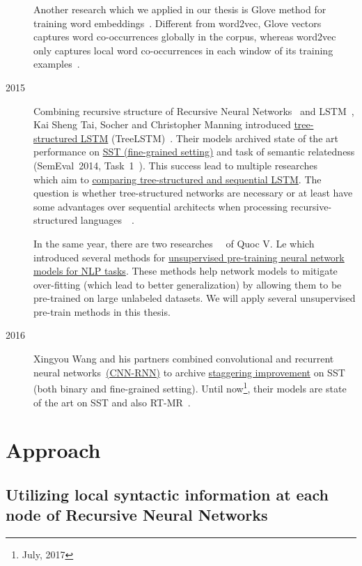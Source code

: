 \begin{description}
Another research which we applied in our thesis is Glove method for training word embeddings~\cite{glove}.
Different from word2vec, Glove vectors captures word co-occurrences globally in the corpus, whereas word2vec only captures local word co-occurrences in each window of its training examples~\cite{glove}.

\item [2015] Combining recursive structure of Recursive Neural Networks~\cite{socher2013recursive} and LSTM~\cite{originLSTM}, Kai Sheng Tai, Socher and Christopher Manning introduced \hyperref[sec:treelstm]{tree-structured LSTM}  (TreeLSTM)~\cite{treeLSTM}.
Their models archived state of the art performance on \hyperref[sec:sst]{SST (fine-grained setting)} and task of semantic relatedness (SemEval~2014, Task~1~\cite{SemeEvalTask1}).
This success lead to multiple researches~\cite{need-tree}~\cite{bowman-treevslstm}~\cite{Graves_Nature2016} which aim to \hyperref[treelstm-advantage]{comparing tree-structured and sequential LSTM}. 
The question is whether tree-structured networks are necessary or at least have some advantages over sequential architects when processing recursive-structured languages~\cite{need-tree}~\cite{bowman-treevslstm}.   

In the same year, there are two researches~\cite{ParagraphVec}~\cite{semisup-seq2seq} of Quoc V. Le which introduced several methods for \hyperref[sec:unsupervised-pretrain]{unsupervised pre-training neural network models for NLP tasks}.
These methods help network models to mitigate over-fitting (which lead to better generalization) by allowing them to be pre-trained on large unlabeled datasets.
We will apply several unsupervised pre-train methods in this thesis.

\item [2016] Xingyou Wang and his partners combined convolutional and recurrent neural networks~\hyperref[cnn-rnn]{(CNN-RNN)} to archive \hyperref[table:cnn-rnn]{staggering improvement} on SST (both binary and fine-grained setting).
Until now\footnote{July, 2017}, their models are state of the art on SST and also RT-MR~\cite{cnn-rnn}.
\end{description}  

\section{Approach}
\subsection{Utilizing local syntactic information at each node of Recursive Neural Networks}
